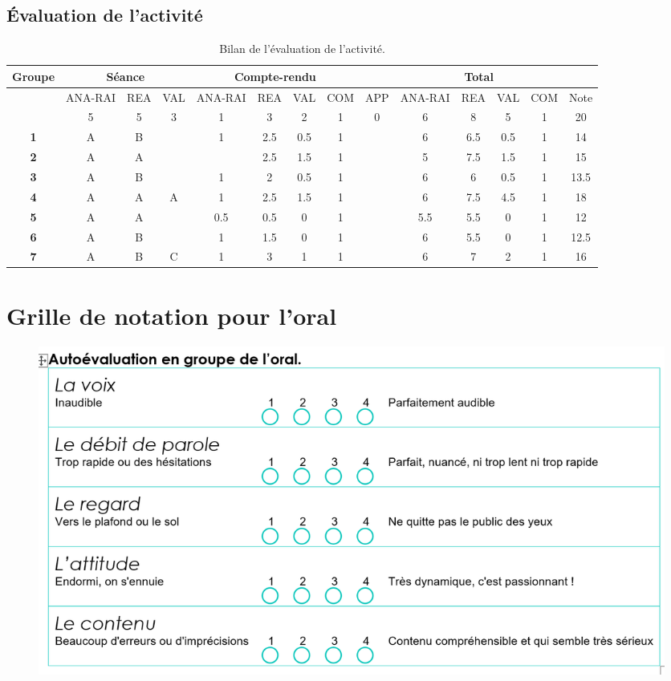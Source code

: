\documentclass[12pt,a4paper, fleqn]{report}
\newcommand{\app}{\colorbox{bleu_c}{\textcolor{bleu_f}{APP}}}
\newcommand{\rea}{\colorbox{yellow_c}{\textcolor{yellow_f}{REA}}}
\newcommand{\anarai}{\colorbox{green_c}{\textcolor{green_f}{ANA-RAI}}}
\newcommand{\val}{\colorbox{orange_c}{\textcolor{orange_f}{VAL}}}
\newcommand{\com}{\colorbox{red_c}{\textcolor{red_f}{COM}}}
\begin{document}
\begin{landscape}



\chapter{Évaluation de l'activité}
\label{ann:eval}
\vfill
\begin{table}[h]
\renewcommand\arraystretch{1.5}		%
\begin{center}
\begin{tabular}{|c|c|c|c|c|c|c|c|c|c|c|c|c|c|}
\hline
\textbf{Groupe} & \multicolumn{3}{c|}{\textbf{Séance}} & \multicolumn{4}{c|}{\textbf{Compte-rendu}} & \multicolumn{6}{c|}{\textbf{Total}} \\
\hline 
& \anarai & \rea & \val & \anarai & \rea &\val & \com & \app & \anarai & \rea & \val & \com & Note \\
\hline
& 5 & 5 & 3 & 1 & 3 & 2 & 1 & 0 & 6 & 8 & 5 & 1 & 20 \\
\hline\hline
\textbf{1} & A & B & & 1 & 2.5 & 0.5 & 1 & & 6 & 6.5 & 0.5 & 1 & 14 \\
\hline
\textbf{2} & A & A & & & 2.5 & 1.5 & 1 & & 5 & 7.5 & 1.5 & 1 & 15 \\
\hline
\textbf{3} & A & B & & 1 & 2 & 0.5 & 1 & & 6 & 6 & 0.5 & 1 & 13.5 \\
\hline
\textbf{4} & A & A & A & 1 & 2.5 & 1.5 & 1 & & 6 & 7.5 & 4.5 & 1 & 18 \\
\hline
\textbf{5} & A & A & & 0.5 & 0.5 & 0 & 1 & & 5.5 & 5.5 & 0 & 1 & 12 \\
\hline
\textbf{6} & A & B & & 1 & 1.5 & 0 & 1 & & 6 & 5.5 & 0 & 1 & 12.5  \\
\hline
\textbf{7} & A & B & C & 1 & 3 & 1 & 1 & & 6 & 7 & 2 & 1 & 16 \\
\hline
\end{tabular}
\end{center}
\caption{Bilan de l'évaluation de l'activité.}
\label{tab:eval}
\end{table}
\vfill
\end{landscape}

\chapter{Grille de notation pour l'oral}
\label{ann:oral}

\begin{figure}[htbp]
\center
\includegraphics[width=\linewidth]{grille_notation_oral.png}
\end{figure}
\end{document}
